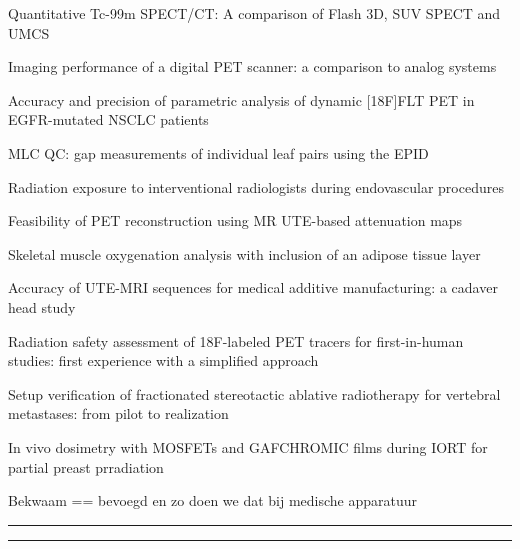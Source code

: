 \documentclass[a4paper,10pt]{report}
\begin{document}
\begin{multicols*}{3}
\begin{packed_enum}
\item[\#1] Quantitative Tc-99m SPECT/CT: A com\-par\-i\-son of Flash 3D, SUV SPECT and UMCS
\item[\#2] Imaging performance of a digital PET scanner: a com\-par\-i\-son to analog systems
\item[\#3] Accuracy and precision of parametric analysis of dynamic [18F]FLT PET in EGFR-mutated NSCLC patients
\item[\#4] MLC QC: gap measurements of individual leaf pairs using the EPID
\item[\#5] Radiation exposure to interventional radiologists during endovascular procedures
\item[\#6] Feasibility of PET reconstruction using MR UTE-based attenuation maps
\item[\#7] Skeletal muscle oxygenation analysis with inclusion of an adipose tissue layer
\item[\#8] Accuracy of UTE-MRI sequences for medical additive manufacturing: a cadaver head study
\item[\#9] Radiation safety assessment of 18F-labeled PET tracers for first-in-human studies: first experience with a simplified approach
\item[\#10] Setup verification of fractionated stereotactic ablative radiotherapy for vertebral metastases: from pilot to realization
\item[\#11] In vivo dosimetry with MOSFETs and GAFCHROMIC films during IORT for partial preast prradiation
\item[\#12] Bekwaam == bevoegd en zo doen we dat bij medische apparatuur %
\end{packed_enum}
\columnbreak

\hrule \vspace{2mm}
\vspace{2mm}\hrule\strut
\vfill


\end{multicols*}
\end{document}
